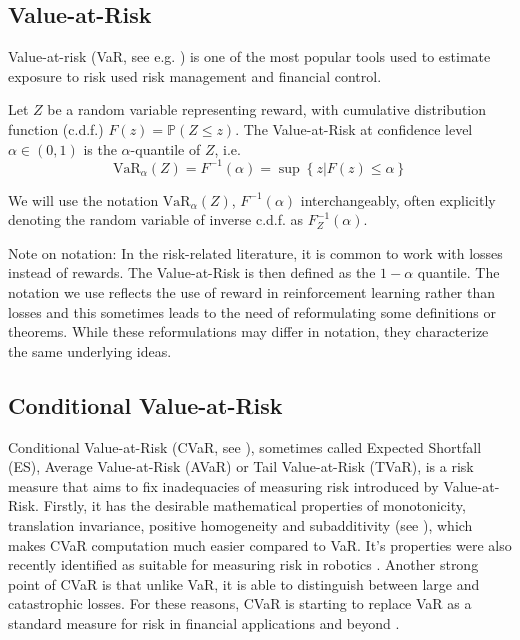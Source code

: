 \subsection{Value-at-Risk}

Value-at-risk (VaR, see e.g. \citet{wipplinger2007philippe}) is one of the most popular tools used to estimate exposure to risk used risk management and financial control.

Let $Z$ be a random variable representing reward, with cumulative distribution function (c.d.f.) $F(z) = \mathbb{P}(Z \le z)$.
The Value-at-Risk  at confidence level $\alpha \in (0,1)$ is the $\alpha$-quantile of $Z$, i.e. 
\begin{equation}
\text{VaR}_\alpha(Z)=F^{-1}(\alpha)=\sup\left\lbrace z | F(z) \le \alpha \right\rbrace
\end{equation}

We will use the notation $\text{VaR}_\alpha(Z)$, $F^{-1}(\alpha)$ interchangeably, often explicitly denoting the random variable of inverse c.d.f. as $F^{-1}_Z(\alpha)$.

Note on notation: In the risk-related literature, it is common to work with losses instead of rewards. The Value-at-Risk is then defined as the $1-\alpha$ quantile. The notation we use reflects the use of reward in reinforcement learning rather than losses and this sometimes leads to the need of reformulating some definitions or theorems. While these reformulations may differ in notation, they characterize the same underlying ideas.

\subsection{Conditional Value-at-Risk}

Conditional Value-at-Risk (CVaR, see \citet{rockafellar2000optimization,rockafellar2002conditional}), sometimes called Expected Shortfall (ES), Average Value-at-Risk (AVaR) or Tail Value-at-Risk (TVaR), is a risk measure that aims to fix inadequacies of measuring risk introduced by Value-at-Risk. Firstly, it has the desirable mathematical properties of monotonicity, translation invariance, positive homogeneity and subadditivity (see \citet{artzner1999coherent}), which makes CVaR computation much easier compared to VaR. It's properties were also recently identified as suitable for measuring risk in robotics \cite{majumdar2017should}. Another strong point of CVaR is that unlike VaR, it is able to distinguish between large and catastrophic losses. For these reasons, CVaR is starting to replace VaR as a standard measure for risk in financial applications \citep{basel2013fundamental} and beyond \cite{something}.


